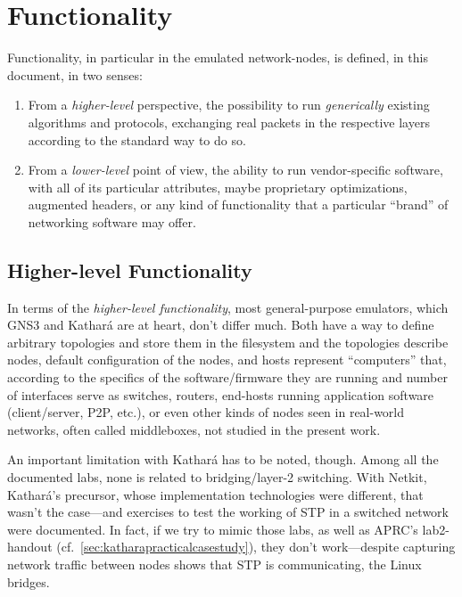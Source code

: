 \section{Functionality}
\label{sec:comparativefunctionality}

Functionality, in particular in the emulated network-nodes, is defined, in this document, in two senses:
\begin{enumerate}
  \item From a \emph{higher-level} perspective, the possibility to run \emph{generically} existing algorithms and protocols, exchanging real packets in the respective layers according to the standard way to do so.
  \item From a \emph{lower-level} point of view, the ability to run vendor-specific software, with all of its particular attributes, maybe proprietary optimizations, augmented headers, or any kind of functionality that a particular ``brand'' of networking software may offer.
\end{enumerate}

\subsection{Higher-level Functionality}

In terms of the \emph{higher-level functionality}, most general-purpose emulators, which GNS3 and Kathará are at heart, don't differ much.
Both have a way to define arbitrary topologies and store them in the filesystem and the topologies describe nodes, default configuration of the nodes, and hosts represent ``computers'' that, according to the specifics of the software/firmware they are running and number of interfaces serve as switches, routers, end-hosts running application software (client/server, P2P, etc.), or even other kinds of nodes seen in real-world networks, often called middleboxes, not studied in the present work.

An important limitation with Kathará has to be noted, though.
Among all the documented labs, none is related to bridging/layer-2 switching.
With Netkit, Kathará's precursor, whose implementation technologies were different, that wasn't the case---and exercises to test the working of STP in a switched network were documented.
In fact, if we try to mimic those labs, as well as APRC's lab2-handout (cf.~\ref{sec:katharapracticalcasestudy}), they don't work---despite capturing network traffic between nodes shows that STP is communicating, the Linux bridges.

